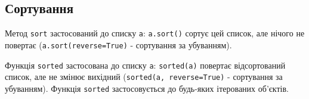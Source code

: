 \subsection{Сортування} 
\begin{frame}

Метод \texttt{sort} застосований до списку \texttt{a}: \texttt{a.sort()}  сортує цей список, але нічого не повертає (\texttt{a.sort(reverse=True)} - сортування за убуванням).

Функція \texttt{sorted} застосована до списку \texttt{a}: \texttt{sorted(a)}  повертає відсортований список, але не змінює вихідний (\texttt{sorted(a, reverse=True)} - сортування за убуванням). Функція \texttt{sorted} застосовується до будь-яких ітерованих об'єктів.

\end{frame}
